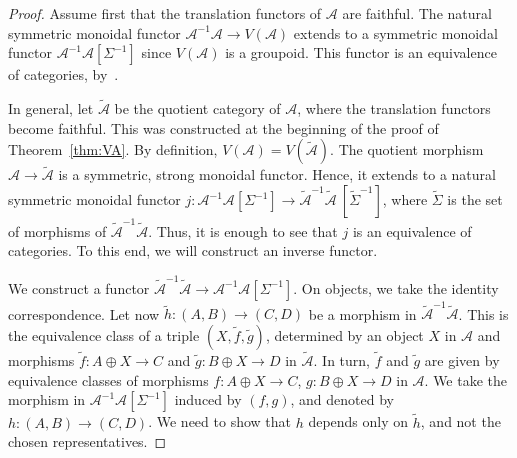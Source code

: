 \documentclass[JEP,XML,SOM,Unicode,published]{cedram}
\theoremstyle{plain}
\theoremstyle{definition}
\newcommand{\Acal}{\mathcal A}
\begin{document}
\begin{proof}
Assume first that the translation functors of $\Acal$ are faithful. The natural symmetric monoidal functor $\Acal^{-1}\Acal\to V(\Acal)$ extends to a symmetric monoidal functor $\Acal^{-1}\Acal[\Sigma^{-1}]$ since $V(\Acal)$ is a groupoid. This functor is an equivalence of categories, by~\cite[III, Cor.\,1.2]{JG}.

In general, let $\widetilde{\Acal}$ be the quotient category of $\Acal$, where the translation functors become faithful. This was constructed at the beginning of the proof of Theorem~\ref{thm:VA}. By definition, $V(\Acal)=V(\widetilde{\Acal} )$. The quotient morphism $\Acal\to\widetilde{\Acal}$ is a symmetric, strong monoidal functor. Hence, it extends to a natural symmetric monoidal functor $j\colon \Acal^{-1}\Acal[\Sigma^{-1}]\to\widetilde{\Acal}^{-1}\widetilde{\Acal}\ [\widetilde{\Sigma}^{-1}]$, where $\widetilde{\Sigma}$ is the set of morphisms of $\widetilde{\Acal}^{-1}\widetilde{\Acal}$. Thus, it is enough to see that $j$ is an equivalence of categories. To this end, we will construct an inverse functor.

We construct a functor $\widetilde{\Acal}^{-1}\widetilde{\Acal}\to\Acal^{-1}\Acal[\Sigma^{-1}]$. On objects, we take the identity correspondence. Let now $\widetilde{h}\colon (A,B)\to (C,D)$ be a morphism in $\widetilde{\Acal}^{-1}\widetilde{\Acal}$. This is the equivalence class of a triple $(X,\widetilde{f},\widetilde{g})$, determined by an object $X$ in $\Acal$ and morphisms $\widetilde{f}\colon A\oplus X\to C$ and $\widetilde{g}\colon B\oplus X\to D$ in $\widetilde{\Acal}$. In turn, $\widetilde{f}$ and $\widetilde{g}$ are given by equivalence classes of morphisms $f\colon A\oplus X\to C$, $g\colon B\oplus X\to D$ in $\Acal$. We take the morphism in $\Acal^{-1}\Acal[\Sigma^{-1}]$ induced by $(f,g)$, and denoted by $h\colon (A,B)\to (C,D)$. We need to show that $h$ depends only on $\widetilde{h}$, and not the chosen representatives.


\end{proof}
\end{document}
